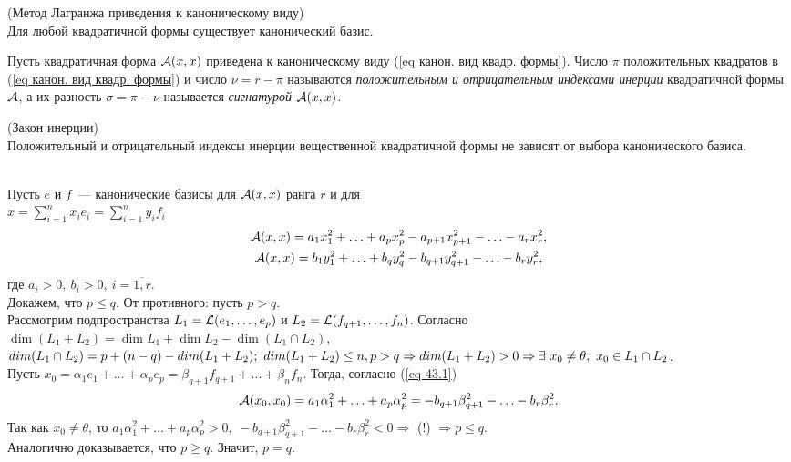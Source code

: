 \begin{theorem}
\label{th метод Лагранжа}
(Метод Лагранжа приведения к каноническому виду)\\
Для любой квадратичной формы существует канонический базис.
\end{theorem}

\begin{definition}
Пусть квадратичная форма ${\mathcal{A}}(x,x)$ приведена к каноническому виду (\eqref{eq канон. вид квадр. формы}). Число $\pi$ положительных квадратов в (\eqref{eq канон. вид квадр. формы}) и число $\nu=r-\pi$ называются \emph{положительным и отрицательным индексами инерции} квадратичной формы ${\mathcal{A}}$, а их разность $\sigma=\pi-\nu$ называется \emph{сигнатурой} ${\mathcal{A}}(x,x)$.
\end{definition}

\begin{theorem}
\label{th закон инерции}
(Закон инерции)\\
Положительный и отрицательный индексы инерции вещественной квадратичной формы не зависят от выбора канонического базиса.
\end{theorem}
\begin{proofocre}
~\\
Пусть $e$ и $f$~--- канонические базисы для ${\mathcal{A}}(x,x)$ ранга $r$ и для\\ $x=\sum_{i=1}^nx_ie_i=\sum_{i=1}^ny_if_i$
\begin{equation}
\label{eq 43.1}
\begin{gathered}
    {\mathcal{A}}(x,x)=a_1x_1^2+\ldots+a_px_p^2-a_{p+1}x_{p+1}^2-\ldots-a_rx_r^2,\\
    {\mathcal{A}}(x,x)=b_1y_1^2+\ldots+b_qy_q^2-b_{q+1}y_{q+1}^2-\ldots-b_ry_r^2,
\end{gathered}
\end{equation}
где $a_i>0,~b_i>0,~i=\overline{1,r}$.\\
Докажем, что $p\le q$. От противного: пусть $p>q$.\\
Рассмотрим подпространства $L_1={\mathcal{L}}(e_1,\ldots,e_p)$ и $L_2={\mathcal{L}}(f_{q+1},\ldots,f_n)$. Согласно $\dim (L_1+L_2) = \dim L_1 + \dim L_2 - \dim(L_1 \cap L_2)$, $dim(L_1\cap L_2)=p+(n-q)-dim(L_1+L_2);~dim(L_1+L_2)\le n,\\p>q \Rightarrow dim(L_1+L_2)>0 \Rightarrow\exists~x_0\neq\theta,~x_0\in L_1\cap L_2$.\\
Пусть $x_0=\alpha_1e_1+\ldots+\alpha_pe_p=\beta_{q+1}f_{q+1}+\ldots+\beta_nf_n$. Тогда, согласно (\eqref{eq 43.1})
\begin{equation}
    {\mathcal{A}}(x_0,x_0)=a_1\alpha_1^2+\ldots+a_p\alpha_p^2=-b_{q+1}\beta_{q+1}^2-\ldots-b_r\beta_r^2.
\end{equation}
Так как $x_0\neq\theta$, то $a_1\alpha_1^2+\ldots+a_p\alpha_p^2>0,~-b_{q+1}\beta_{q+1}^2-\ldots-b_r\beta_r^2<0 \Rightarrow$ (!) $\Rightarrow p\le q$.\\
Аналогично доказывается, что $p\ge q$. Значит, $p=q$.
\end{proofocre}


